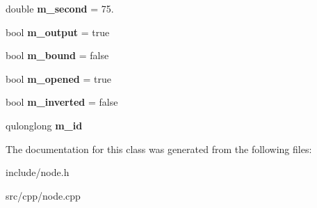 \begin{DoxyCompactItemize}
\mbox{\label{classNode_a9a2c75b4e1cc47bb465b6e032d6aa11e}} 
double {\bfseries m\+\_\+second} = 75.
\item 
\mbox{\label{classNode_a5c0e1404f737864c62e810fe595c7bde}} 
bool {\bfseries m\+\_\+output} = true
\item 
\mbox{\label{classNode_aad787043f0df6d527c391ea50583250a}} 
bool {\bfseries m\+\_\+bound} = false
\item 
\mbox{\label{classNode_adb24661af93e1a2749cf360191781d5f}} 
bool {\bfseries m\+\_\+opened} = true
\item 
\mbox{\label{classNode_af1127c01cdf01117e053022ab8777768}} 
bool {\bfseries m\+\_\+inverted} = false
\item 
\mbox{\label{classNode_a5c1c0ff28c4d71f57d44400cba820caa}} 
qulonglong {\bfseries m\+\_\+id}
\end{DoxyCompactItemize}


The documentation for this class was generated from the following files\+:\begin{DoxyCompactItemize}
\item 
include/node.\+h\item 
src/cpp/node.\+cpp\end{DoxyCompactItemize}

